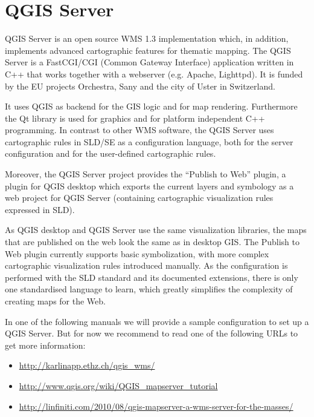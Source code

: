 
\chapter{QGIS Server}\label{label_qgisserver}


QGIS Server is an open source WMS 1.3 implementation which, in addition,
implements advanced cartographic features for thematic mapping. The QGIS
Server is a FastCGI/CGI (Common Gateway Interface) application written in
C++ that works together with a webserver (e.g. Apache, Lighttpd). It is 
funded by the EU projects Orchestra, Sany and the city of Uster in 
Switzerland.

It uses QGIS as backend for the GIS logic and for map rendering. Furthermore the 
Qt library is used for graphics and for platform independent 
C++ programming. In contrast to other WMS software, the QGIS Server uses 
cartographic rules in SLD/SE as a configuration language, both for the server 
configuration and for the user-defined cartographic rules. 

Moreover, the QGIS Server project provides the “Publish to Web” plugin, a 
plugin for QGIS desktop which exports the current layers and symbology as a 
web project for QGIS Server (containing cartographic visualization rules 
expressed in SLD).

As QGIS desktop and QGIS Server use the same visualization libraries, the
maps that are published on the web look the same as in desktop GIS. The 
Publish to Web plugin currently supports basic symbolization, with more complex 
cartographic visualization rules introduced manually. As the configuration is 
performed with the SLD standard and its documented extensions, there is only 
one standardised language to learn, which greatly simplifies the complexity 
of creating maps for the Web.

In one of the following manuals we will provide a sample configuration to 
set up a QGIS Server. But for now we recommend to read one of the following 
URLs to get more information:

\begin{itemize}
\item \url{http://karlinapp.ethz.ch/qgis\_wms/} \\
\item \url{http://www.qgis.org/wiki/QGIS\_mapserver\_tutorial} \\
\item \url{http://linfiniti.com/2010/08/qgis-mapserver-a-wms-server-for-the-masses/}
\end{itemize}

